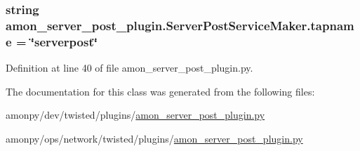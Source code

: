 \hypertarget{classamon__server__post__plugin_1_1_server_post_service_maker_a4d99413d155a4fd18efe012c18550314}{
\subsubsection[{tapname}]{\setlength{\rightskip}{0pt plus 5cm}string amon\-\_\-server\-\_\-post\-\_\-plugin.\-Server\-Post\-Service\-Maker.\-tapname = \char`\"{}serverpost\char`\"{}\hspace{0.3cm}{\ttfamily [static]}}}\label{classamon__server__post__plugin_1_1_server_post_service_maker_a4d99413d155a4fd18efe012c18550314}


Definition at line 40 of file amon\-\_\-server\-\_\-post\-\_\-plugin.\-py.



The documentation for this class was generated from the following files\-:\begin{DoxyCompactItemize}
\item 
amonpy/dev/twisted/plugins/\hyperlink{dev_2twisted_2plugins_2amon__server__post__plugin_8py}{amon\-\_\-server\-\_\-post\-\_\-plugin.\-py}\item 
amonpy/ops/network/twisted/plugins/\hyperlink{ops_2network_2twisted_2plugins_2amon__server__post__plugin_8py}{amon\-\_\-server\-\_\-post\-\_\-plugin.\-py}\end{DoxyCompactItemize}
